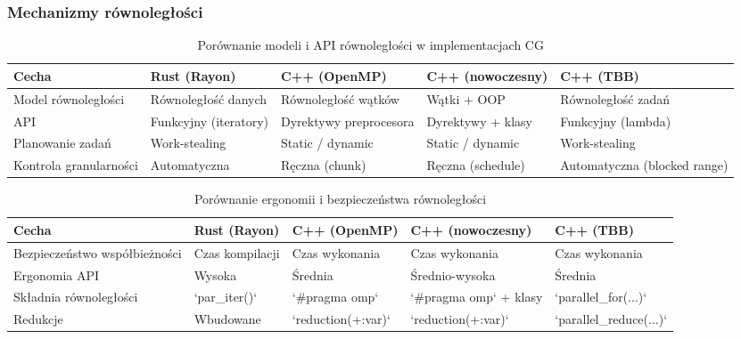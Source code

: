 \subsubsection{Mechanizmy równoległości}

\begin{table}[H]
    \centering
    \scriptsize
    \caption{Porównanie modeli i API równoległości w implementacjach CG}
    \begin{tabular}{|p{3cm}|p{2.5cm}|p{2.5cm}|p{2.5cm}|p{2.5cm}|}
    \hline
    \textbf{Cecha} & \textbf{Rust (Rayon)} & \textbf{C++ (OpenMP)} & \textbf{C++ (nowoczesny)} & \textbf{C++ (TBB)} \\
    \hline
    Model równoległości & Równoległość danych & Równoległość wątków & Wątki + OOP & Równoległość zadań \\
    \hline
    API & Funkcyjny (iteratory) & Dyrektywy preprocesora & Dyrektywy + klasy & Funkcyjny (lambda) \\
    \hline
    Planowanie zadań & Work-stealing & Static / dynamic & Static / dynamic & Work-stealing \\
    \hline
    Kontrola granularności & Automatyczna & Ręczna (chunk) & Ręczna (schedule) & Automatyczna (blocked range) \\
    \hline
    \end{tabular}
\end{table}

\begin{table}[H]
    \centering
    \scriptsize
    \caption{Porównanie ergonomii i bezpieczeństwa równoległości}
    \begin{tabular}{|p{3cm}|p{2.5cm}|p{2.5cm}|p{2.5cm}|p{2.5cm}|}
    \hline
    \textbf{Cecha} & \textbf{Rust (Rayon)} & \textbf{C++ (OpenMP)} & \textbf{C++ (nowoczesny)} & \textbf{C++ (TBB)} \\
    \hline
    Bezpieczeństwo współbieżności & Czas kompilacji & Czas wykonania & Czas wykonania & Czas wykonania \\
    \hline
    Ergonomia API & Wysoka & Średnia & Średnio-wysoka & Średnia \\
    \hline
    Składnia równoległości & `par\_iter()` & `\#pragma omp` & `\#pragma omp` + klasy & `parallel\_for(...)` \\
    \hline
    Redukcje & Wbudowane & `reduction(+:var)` & `reduction(+:var)` & `parallel\_reduce(...)` \\
    \hline
    \end{tabular}
\end{table}
